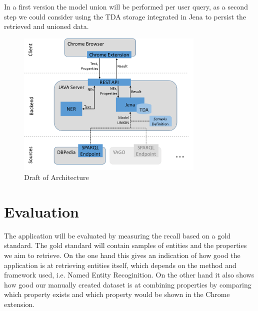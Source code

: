 \documentclass[11pt,titlepage,oneside,openany]{article}
\begin{document}
In a first version the model union will be performed per user query, as a second
step we could consider using the TDA storage integrated in Jena to persist the
retrieved and unioned data.

\begin{figure}[ht]
	\centering
	\includegraphics[width=0.8\textwidth]{architecture}
	\caption{Draft of Architecture}
	\label{fig:architecture}
\end{figure}


\section{Evaluation}
The application will be evaluated by measuring the recall based on a gold
standard. The gold standard will contain samples of entities and the properties
we aim to retrieve. On the one hand this gives an indication of how good the
application is at retrieving entities itself, which depends on the method and
framework used, i.e. Named Entity Recoginition. On the other hand it also shows
how good our manually created dataset is at combining properties by comparing
which property exists and which property would be shown in the Chrome extension.
\end{document}
